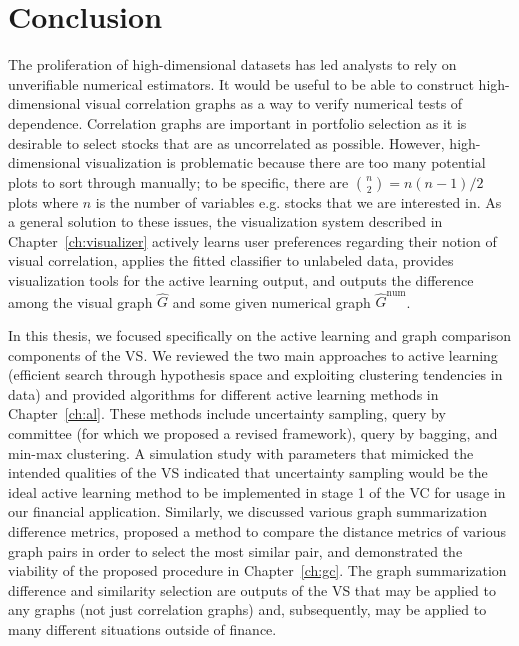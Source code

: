 \section{Conclusion}
\label{sec:conclusion}

The proliferation of high-dimensional datasets has led analysts to rely on 
unverifiable numerical estimators. It would be useful to be able to construct 
high-dimensional visual correlation graphs as a way to verify numerical 
tests of dependence. Correlation graphs are important in portfolio selection as 
it is desirable to select stocks that are as uncorrelated as 
possible. However, high-dimensional visualization is problematic because there 
are too many potential plots to sort through manually; to be 
specific, there are ${n\choose 2} = n(n-1)/2$  plots where $n$ is the number of 
variables e.g. stocks that we are interested in. As a general solution to these 
issues, the visualization system described in Chapter~\ref{ch:visualizer} 
actively learns user preferences regarding 
their notion of visual correlation, applies 
the fitted classifier to unlabeled data, provides visualization tools for the 
active learning output, and outputs the difference among the visual graph 
$\hat{G}$ and some given numerical graph $\hat{G}^{\text{num}}$.

In this thesis, we focused specifically on the active learning and graph 
comparison components of the VS. We reviewed the two main approaches to active 
learning (efficient search through hypothesis space and 
exploiting clustering tendencies in data) and provided algorithms for 
different active learning methods in Chapter~\ref{ch:al}. These methods include 
uncertainty sampling, query by committee (for which we proposed a revised 
framework), query by bagging, and min-max clustering. A simulation study 
with parameters that mimicked the intended qualities of the VS indicated that 
uncertainty sampling would be the ideal active learning method to be 
implemented in stage 1 of the VC for usage in our financial application. 
Similarly, we discussed 
various graph summarization difference metrics, proposed a method to compare 
the distance metrics of various graph pairs in order to select the most 
similar pair, and demonstrated the viability of the proposed procedure in 
Chapter~\ref{ch:gc}. The graph summarization difference and similarity 
selection are outputs of the VS that may be applied to any graphs (not just 
correlation graphs) and, subsequently, may be applied to many different 
situations outside of finance.


